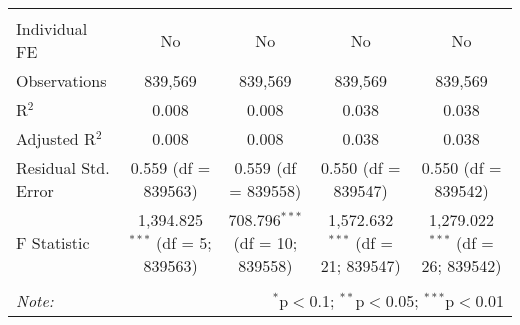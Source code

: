 \documentclass[
]{article}
\begin{document}
\begin{table}[!htbp]
{\begin{tabular}{@{\extracolsep{5pt}}lcccc}
\hline \\[-1.8ex] 
Individual FE & No & No & No & No \\ 
Observations & 839,569 & 839,569 & 839,569 & 839,569 \\ 
R$^{2}$ & 0.008 & 0.008 & 0.038 & 0.038 \\ 
Adjusted R$^{2}$ & 0.008 & 0.008 & 0.038 & 0.038 \\ 
Residual Std. Error & 0.559 (df = 839563) & 0.559 (df = 839558) & 0.550 (df = 839547) & 0.550 (df = 839542) \\ 
F Statistic & 1,394.825$^{***}$ (df = 5; 839563) & 708.796$^{***}$ (df = 10; 839558) & 1,572.632$^{***}$ (df = 21; 839547) & 1,279.022$^{***}$ (df = 26; 839542) \\ 
\hline 
\hline \\[-1.8ex] 
\textit{Note:}  & \multicolumn{4}{r}{$^{*}$p$<$0.1; $^{**}$p$<$0.05; $^{***}$p$<$0.01} \\ 
\end{tabular}
} 
\end{table} 
\newpage
\end{document}
